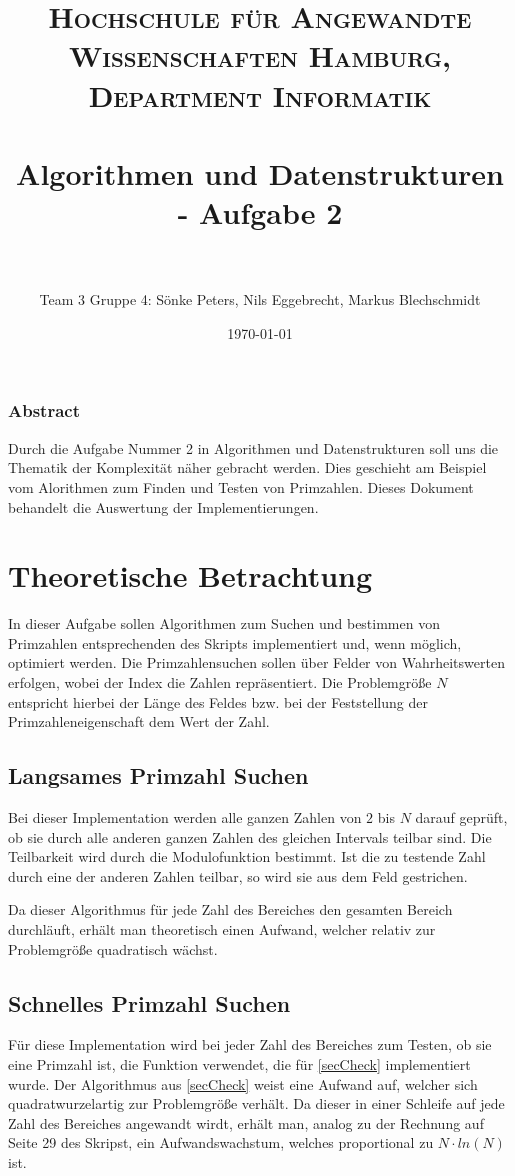 \documentclass[paper=a4, fontsize=11pt]{scrartcl} %
\title{
\normalfont \normalsize
\textsc{Hochschule für Angewandte Wissenschaften Hamburg, Department Informatik} \\ [25pt] %
\horrule{0.5pt} \\[0.4cm] %
\huge Algorithmen und Datenstrukturen - Aufgabe 2 \\ %
\horrule{2pt} \\[0.5cm] %
}
\author{Team 3 Gruppe 4: Sönke Peters, Nils Eggebrecht, Markus Blechschmidt} %
\date{\normalsize\today} %
\numberwithin{equation}{section} %
\numberwithin{figure}{section} %
\numberwithin{table}{section} %
\begin{document}
\maketitle %

\subsubsection*{Abstract}
Durch die Aufgabe Nummer 2 in Algorithmen und Datenstrukturen soll uns die
Thematik der Komplexit\"at n\"aher gebracht werden. Dies geschieht am Beispiel vom
Alorithmen zum Finden und Testen von Primzahlen. Dieses Dokument behandelt die
Auswertung der Implementierungen.

\renewcommand{\contentsname}{Inhaltsangabe}
\renewcommand*\listtablename{Tabellen}
\renewcommand*\listfigurename{Darstellungen}
\tableofcontents
\listoftables
\listoffigures

\section{Theoretische Betrachtung}

In dieser Aufgabe sollen Algorithmen zum Suchen und bestimmen von Primzahlen
entsprechenden des Skripts implementiert und, wenn m\"oglich, optimiert werden.
Die Primzahlensuchen sollen \"uber Felder von Wahrheitswerten erfolgen, wobei der
Index die Zahlen repr\"asentiert. Die Problemgr\"o{\ss}e $N$ entspricht hierbei
der L\"ange des Feldes bzw. bei der Feststellung der Primzahleneigenschaft dem Wert der Zahl.

\subsection{Langsames Primzahl Suchen}\label{secSlow}
Bei dieser Implementation werden alle ganzen Zahlen von $2$ bis $N$ darauf
gepr\"uft, ob sie durch alle anderen ganzen Zahlen des gleichen Intervals teilbar
sind. Die Teilbarkeit wird durch die Modulofunktion bestimmt. Ist die zu testende
Zahl durch eine der anderen Zahlen teilbar, so wird sie aus dem Feld gestrichen.

Da dieser Algorithmus f\"ur jede Zahl des Bereiches den gesamten Bereich durchl\"auft,
erh\"alt man theoretisch einen Aufwand, welcher relativ zur Problemgr\"o{\ss}e
quadratisch w\"achst.

\subsection{Schnelles Primzahl Suchen}\label{secFast}
F\"ur diese Implementation wird bei jeder Zahl des Bereiches zum Testen, ob sie
eine Primzahl ist, die Funktion verwendet, die f\"ur \ref{secCheck} implementiert
wurde. Der Algorithmus aus \ref{secCheck} weist eine Aufwand auf, welcher sich
quadratwurzelartig zur Problemgr\"o{\ss}e verh\"alt. Da dieser in einer Schleife
auf jede Zahl des Bereiches angewandt wirdt, erh\"alt man, analog zu der Rechnung
auf Seite 29 des Skripst, ein Aufwandswachstum, welches proportional zu $N \cdot ln(N)$ ist.
\end{document}

